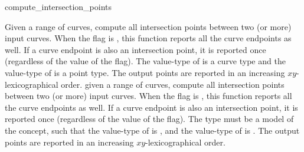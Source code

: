 \ccRefPageBegin

\begin{ccRefFunction}{compute_intersection_points}


{Given a range of curves, compute all intersection points between two (or more)
 input curves. When the flag  is , 
  this function reports all the curve endpoints as well. If a curve
  endpoint is also an intersection point, it is reported once (regardless
  of the value of the  flag). The value-type of
   is a curve type and the value-type of 
  is a point type. The output points are reported in an increasing
  $xy$-lexicographical order.}
\ccGlue
{}
{given a range of curves, compute all intersection points between two (or more)
 input curves. When the flag  is , 
  this function reports all the curve endpoints as well. If a curve
  endpoint is also an intersection point, it is reported once (regardless
  of the value of the  flag). The  type
  must be a model of the  concept, such that the
  value-type of  is , and the
  value-type of  is .
 The output points are reported in an increasing $xy$-lexicographical order.}
\end{ccRefFunction}

\ccRefPageEnd

